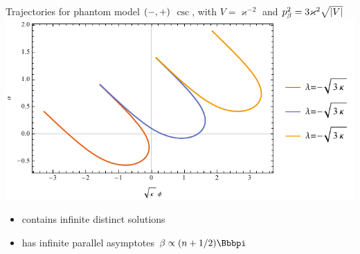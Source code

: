 \documentclass[8pt]{beamer}
\begin{document}
\begin{frame}%
{Trajectories for phantom model ${\left(-,+\right)}$}%
{$\csc$, with $V = \varkappa^{-2}$ and
$p_\beta^2 = 3\varkappa^2\sqrt{{\left|V\right|}}$}
\includegraphics[width=\textwidth]{../plots.nb/csc_lamb_r.pdf}
\begin{itemize}
	\item contains infinite distinct solutions
	\item has infinite parallel asymptotes $\beta \propto \rbr{n+1/2}\pp $
\end{itemize}
\end{frame}
\end{document}
